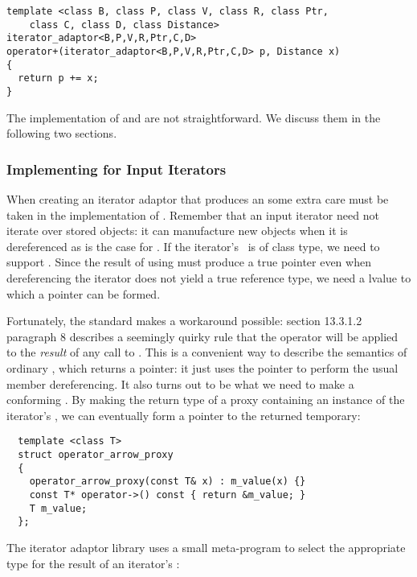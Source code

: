 \documentclass{netobjectdays}
\newcommand{\valuetype}{\code{value\_\-type}}
\begin{document}
{\footnotesize
\begin{verbatim}
template <class B, class P, class V, class R, class Ptr,
    class C, class D, class Distance>
iterator_adaptor<B,P,V,R,Ptr,C,D>
operator+(iterator_adaptor<B,P,V,R,Ptr,C,D> p, Distance x)
{
  return p += x;
}
\end{verbatim}
}

The implementation of  and are not
straightforward. We discuss them in the following two sections.

\subsubsection{Implementing  for Input Iterators}
\label{sec:operator-arrow}

When creating an iterator adaptor that produces an
 some extra care must be taken in the
implementation of . Remember that an input iterator
need not iterate over stored objects: it can manufacture new objects
when it is dereferenced as is the case for
. If the iterator's \valuetype\ is of
class type, we need to support . Since the result of
using  must produce a true pointer even when
dereferencing the iterator does not yield a true reference type, we
need a  lvalue to which a pointer can be formed.

Fortunately, the standard makes a workaround possible: section
13.3.1.2 paragraph 8 describes a seemingly quirky rule that the
\code{->} operator will be applied to the \emph{result} of any call to
. This is a convenient way to describe the semantics
of ordinary , which returns a pointer: it just uses
the pointer to perform the usual member dereferencing. It also turns
out to be what we need to make a conforming
. By making the return type of
 a proxy containing an instance of the iterator's
\valuetype{}, we can eventually form a  pointer to the
returned temporary:

{\footnotesize
\begin{verbatim}
  template <class T>
  struct operator_arrow_proxy
  {
    operator_arrow_proxy(const T& x) : m_value(x) {}
    const T* operator->() const { return &m_value; }
    T m_value;
  };
\end{verbatim}
}

\noindent The iterator adaptor library uses a small meta-program to
select the appropriate type for the result of an iterator's
:
\end{document}
